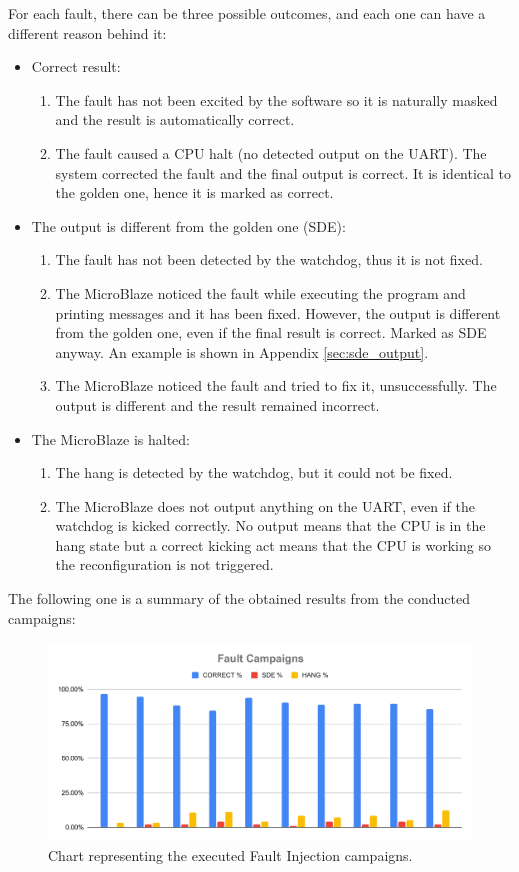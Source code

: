 For each fault, there can be three possible outcomes, and each one can have a different reason behind it:
\begin{itemize}
    \item Correct result:
    \begin{enumerate}
        \item The fault has not been excited by the software so it is naturally masked and the result is automatically correct.
        \item The fault caused a CPU halt (no detected output on the UART). The system corrected the fault and the final output is correct. It is identical to the golden one, hence it is marked as correct.
    \end{enumerate}
    \item The output is different from the golden one (SDE):
    \begin{enumerate}
        \item The fault has not been detected by the watchdog, thus it is not fixed.
        \item The MicroBlaze noticed the fault while executing the program and printing messages and it has been fixed. However, the output is different from the golden one, even if the final result is correct. Marked as SDE anyway. An example is shown in Appendix \ref{sec:sde_output}.
        \item The MicroBlaze noticed the fault and tried to fix it, unsuccessfully. The output is different and the result remained incorrect.
    \end{enumerate}
    \item The MicroBlaze is halted:
    \begin{enumerate}
        \item The hang is detected by the watchdog, but it could not be fixed.
        \item The MicroBlaze does not output anything on the UART, even if the watchdog is kicked correctly. No output means that the CPU is in the hang state but a correct kicking act means that the CPU is working so the reconfiguration is not triggered.
    \end{enumerate}
\end{itemize}

\newpage
The following one is a summary of the obtained results from the conducted campaigns:

\begin{figure}[H]
\centering
\includegraphics[width=0.95\linewidth]{images/chapter5/mchart.pdf}
\caption{Chart representing the executed Fault Injection campaigns.}
\end{figure}

